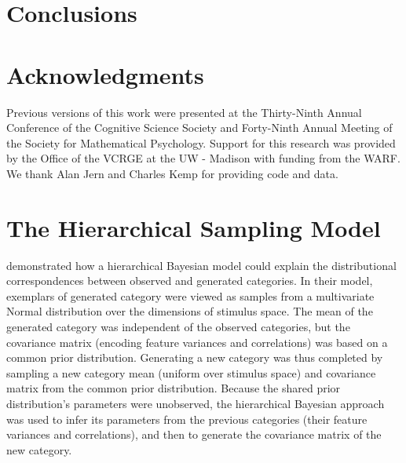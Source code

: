 \documentclass[12pt]{article}
\begin{document}
\begin{flushleft}
\section{Conclusions}



\clearpage
\section{Acknowledgments}
Previous versions of this work were presented at the Thirty-Ninth Annual Conference of the Cognitive Science Society and Forty-Ninth Annual Meeting of the Society for Mathematical Psychology. Support for this research was provided by the Office of the VCRGE at the UW - Madison with funding from the WARF. We thank Alan Jern and Charles Kemp for providing code and data.
\end{flushleft}


\clearpage


\clearpage


\appendix
{}

\section{The Hierarchical Sampling Model}
\label{ap:hsampling-definition}

\cite{jern2013probabilistic} demonstrated how a hierarchical Bayesian model could explain the distributional correspondences between observed and generated categories. In their model, exemplars of generated category were viewed as samples from a multivariate Normal distribution over the dimensions of stimulus space. The mean of the generated category was independent of the observed categories, but the covariance matrix (encoding feature variances and correlations) was based on a common prior distribution. Generating a new category was thus completed by sampling a new category mean (uniform over stimulus space) and covariance matrix from the common prior distribution. Because the shared prior distribution's parameters were unobserved, the hierarchical Bayesian approach was used to infer its parameters from the previous categories (their feature variances and correlations), and then to generate the covariance matrix of the new category.
\end{document}

